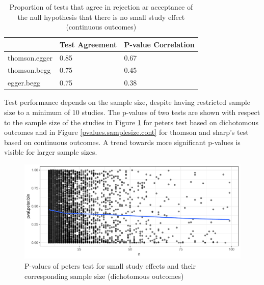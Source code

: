 \documentclass[11pt,a4paper,twoside]{book}\usepackage[]{graphicx}\usepackage[]{color}
\newenvironment{knitrout}{}{} %
\begin{document}
\begin{table}[ht]
\centering
\begingroup\footnotesize
\begin{tabular}{lll}
  \hline
 & Test Agreement & P-value Correlation \\ 
  \hline
thomson.egger & 0.85 & 0.67 \\ 
  thomson.begg & 0.75 & 0.45 \\ 
  egger.begg & 0.75 & 0.38 \\ 
   \hline
\end{tabular}
\endgroup
\caption{Proportion of tests that agree in rejection ar acceptance of the null hypothesis that there is no small study effect (continuous outcomes)} 
\label{agreement.cont}
\end{table}


\vspace{0mm}
Test performance depends on the sample size, despite having restricted sample size to a minimum of 10 studies. The p-values of two tests are shown with respect to the sample size of the studies in Figure \ref{pvalues.samplesize.bin} for peters test based on dichotomous outcomes and in Figure \ref{pvalues.samplesize.cont} for thomson and sharp's test based on continuous outcomes. %
A trend towards more significant p-values is visible for larger sample sizes.

\begin{figure}
\begin{knitrout}
\color{fgcolor}

{\centering \includegraphics[width=\textwidth-3cm]{figure/ch02_figunnamed-chunk-23-1} 

}



\end{knitrout}
\caption{P-values of peters test for small study effects and their corresponding sample size (dichotomous outcomes)}
\label{pvalues.samplesize.bin}
\end{figure}
\end{document}
